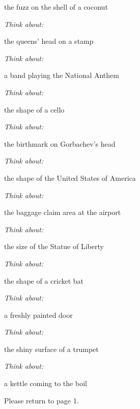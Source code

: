 the fuzz on the shell of a coconut

\textit{Think about:}

the queens' head on a stamp

\textit{Think about:}

a band playing the National Anthem

\textit{Think about:}

the shape of a cello

\textit{Think about:}

the birthmark on Gorbachev's head

\textit{Think about:}

the shape of the United States of America

\textit{Think about:}

the baggage claim area at the airport

\textit{Think about:}

the size of the Statue of Liberty

\textit{Think about:}

the shape of a cricket bat

\textit{Think about:}

a freshly painted door

\textit{Think about:}

the shiny surface of a trumpet

\textit{Think about:}

a kettle coming to the boil


Please return to page 1.
